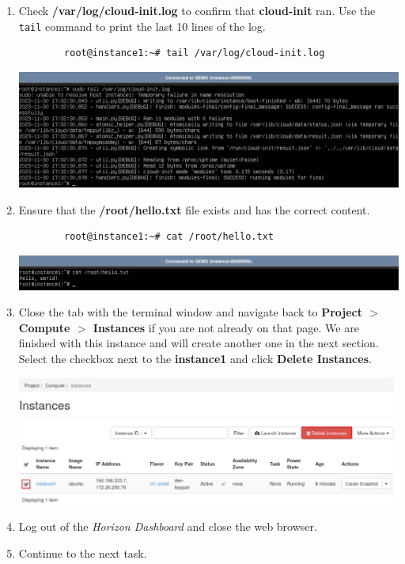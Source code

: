 \documentclass[letterpaper, 12pt]{article}
\begin{document}
\begin{enumerate}
    \item Check \textbf{/var/log/cloud-init.log} to confirm that \textbf{cloud-init} ran. Use the \texttt{tail}
    command to print the last 10 lines of the log.
    \begin{lstlisting}
        root@instance1:~# tail /var/log/cloud-init.log
    \end{lstlisting}

    \begin{center}
        \includegraphics[width=\linewidth]{images/part2/step14.png}
    \end{center}

    \item Ensure that the \textbf{/root/hello.txt} file exists and has the correct content.
    \begin{lstlisting}
        root@instance1:~# cat /root/hello.txt
    \end{lstlisting}

    \begin{center}
        \includegraphics[width=\linewidth]{images/part2/step15.png}
    \end{center}

    \item Close the tab with the terminal window and navigate back to \textbf{Project $>$ Compute $>$ Instances} if you
    are not already on that page. We are finished with this instance and will create another one in the next section.
    Select the checkbox next to the \textbf{instance1} and click \textbf{Delete Instances}.

    \begin{center}
        \includegraphics[width=\linewidth]{images/part2/step16.png}
    \end{center}

    \item Log out of the \textit{Horizon Dashboard} and close the web browser.

    \item Continue to the next task.

\end{enumerate}
\end{document}
